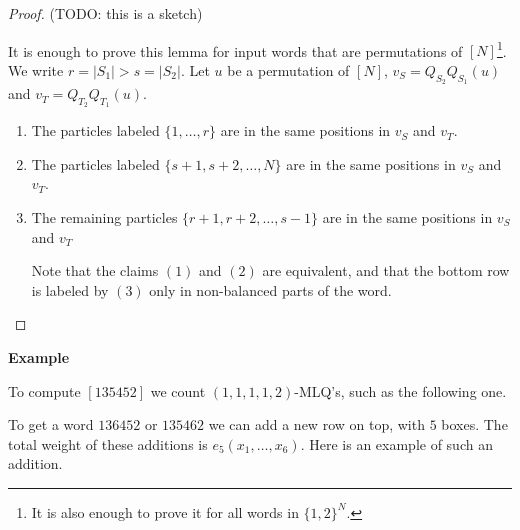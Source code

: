 \documentclass[reqno]{amsart}
\theoremstyle{plain}
\theoremstyle{definition}
\numberwithin{equation}{section}
\begin{document}
\begin{proof} (TODO: this is a sketch)

It is enough to prove this lemma for input words that are permutations of $[N]$\footnote{It is also enough to prove it for all words in $\{1,2\}^N$.}.
We write $r = |S_1| > s = |S_2|$.
Let $u$ be a permutation of $[N]$, $v_S = Q_{S_2}Q_{S_1}(u)$ and $v_T = Q_{T_2}Q_{T_1}(u)$.

\begin{enumerate}
  \item The particles labeled $\{1, \dots, r\}$ are in the same positions in $v_S$ and $v_T$.
  \item The particles labeled $\{s+1, s+2, \dots, N\}$ are in the same positions in $v_S$ and $v_T$.
  \item The remaining particles $\{r+1, r+2, \dots, s-1\}$ are in the same positions in $v_S$ and $v_T$

Note that the claims $(1)$ and $(2)$ are equivalent, and that the bottom row is labeled by $(3)$ only in non-balanced parts of the word.
\end{enumerate}



\end{proof}



{\bf Example}

To compute $[135452]$ we count $(1,1,1,1,2)$-MLQ's, such as the following one.


To get a word $136452$ or $135462$ we can add a new row on top, with $5$ boxes. The total weight of these additions is $e_5(x_1, \dots, x_6)$. Here is an example of such an addition.
\end{document}
